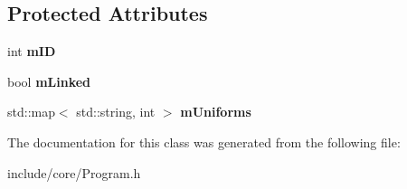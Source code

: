 \subsection*{\-Protected \-Attributes}
\begin{DoxyCompactItemize}
\item 
\hypertarget{classde_1_1_program_a6a86a66742d97071ff91487f785bd83c}{
int {\bfseries m\-I\-D}}
\label{classde_1_1_program_a6a86a66742d97071ff91487f785bd83c}

\item 
\hypertarget{classde_1_1_program_ab6272696655327867ed8c767365f8bda}{
bool {\bfseries m\-Linked}}
\label{classde_1_1_program_ab6272696655327867ed8c767365f8bda}

\item 
\hypertarget{classde_1_1_program_a42d4834609189072d28ac6d6dfeb75a5}{
std\-::map$<$ std\-::string, int $>$ {\bfseries m\-Uniforms}}
\label{classde_1_1_program_a42d4834609189072d28ac6d6dfeb75a5}

\end{DoxyCompactItemize}


\-The documentation for this class was generated from the following file\-:\begin{DoxyCompactItemize}
\item 
include/core/\-Program.\-h\end{DoxyCompactItemize}
